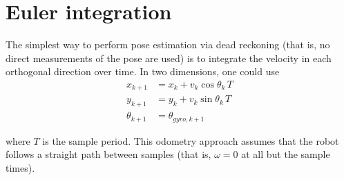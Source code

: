 \section{Euler integration}

The simplest way to perform pose estimation via dead reckoning (that is, no
direct measurements of the pose are used) is to integrate the velocity in each
orthogonal direction over time. In two dimensions, one could use
\begin{align*}
  x_{k+1} &= x_k + v_k\cos\theta_k\,T \\
  y_{k+1} &= y_k + v_k\sin\theta_k\,T \\
  \theta_{k+1} &= \theta_{gyro,k+1}
\end{align*}

where $T$ is the sample period. This odometry approach assumes that the robot
follows a straight path between samples (that is, $\omega = 0$ at all but the
sample times).
